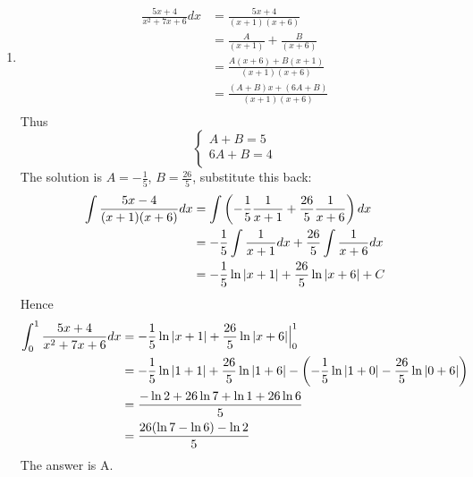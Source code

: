 \documentclass{article}
\numberwithin{equation}{section}
\begin{document}
\begin{enumerate}
    \item 
    \begin{align*}
    \frac{5x + 4}{x^2 + 7x + 6}dx &= \frac{5x+4}{(x+1)(x+6)}\\
    &= \frac{A}{(x+1)} + \frac{B}{(x+6)}\\
    &= \frac{A(x+6) + B(x+1)}{(x+1)(x+6)}\\
    &= \frac{(A+B)x + (6A+B)}{(x+1)(x+6)}\\
    \end{align*}
    Thus
    \[
    \begin{cases}
        A + B = 5\\
        6A +B = 4\\
    \end{cases}
    \]
    The solution is $A = -\frac{1}{5}$, $B = \frac{26}{5}$, substitute this back:
    \begin{align*}
        \int \frac{5x-4}{(x+1)(x+6)} dx &= \int \left(-\frac{1}{5}\frac{1}{x+1} + \frac{26}{5}\frac{1}{x+6}\right)dx\\
        &= -\frac{1}{5}\int \frac{1}{x+1}dx + \frac{26}{5}\int \frac{1}{x+6} dx\\
        &= -\frac{1}{5} \ln \abs{x+1} +\frac{26}{5}\ln \abs{x+6}+C\\
    \end{align*}
    Hence
    \begin{align*}
        \int_{0}^{1} \frac{5x + 4}{x^2 + 7x + 6}dx &=-\frac{1}{5} \ln \abs{x+1} +\frac{26}{5}\ln \abs{x+6} \Big|_0^1\\
        &= -\frac{1}{5} \ln \abs{1+1} + \frac{26}{5}\ln \abs{1+6} - \left(-\frac{1}{5}\ln \abs{1+0} - \frac{26}{5} \ln \abs{0+6}\right)\\
        &= \frac{- \ln 2 + 26 \ln 7 + \ln 1 + 26\ln 6}{5}\\
        &= \frac{26(\ln 7 - \ln 6) -\ln 2}{5}
    \end{align*}
    The answer is A.
\end{enumerate}
\end{document}
